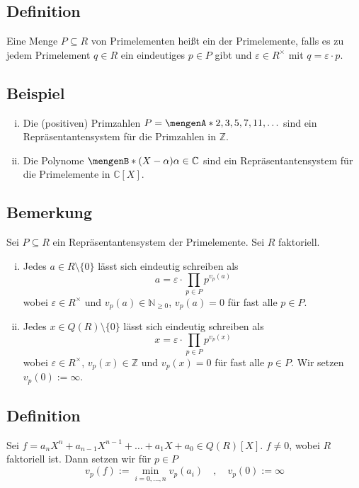 \subsection[Definition: Repräsentantensystem]{Definition} %
\label{sub:88}
Eine Menge $P \subseteq R$ von Primelementen heißt
ein  der Primelemente, falls es zu jedem Primelement $q \in R$ ein eindeutiges $p \in P$ gibt
und $\varepsilon \in R^\times$ mit $q= \varepsilon \cdot p$. 

\subsection[Beispiel für Repräsentantensysteme]{Beispiel} %
\label{sub:89}
\begin{enumerate}[i)]
	\item Die (positiven) Primzahlen $P=\set{2,3,5,7,11, \ldots} $ sind ein Repräsentantensystem für die Primzahlen in $\mathds{Z}$.
	\item Die Polynome $\set[(X- \alpha)]{\alpha \in \mathds{C}} $ sind ein Repräsentantensystem für die Primelemente in $\mathds{C}[X]$.
\end{enumerate}

\subsection[Bemerkung: Darstellung beliebiger Ringelemente durch Repräsentantensystem]{Bemerkung} %
\label{sub:810}
Sei $P \subseteq R$ ein Repräsentantensystem der Primelemente. Sei $R$ faktoriell.
\begin{enumerate}[i)]
	\item Jedes $a \in R \setminus \{0\}$ lässt sich eindeutig schreiben als
	\[
		a = \varepsilon \cdot \prod_{p \in P} p^{v_p(a)}
	\]
	wobei $\varepsilon \in R^\times$ und $v_p(a) \in \mathds{N}_{\ge 0}$, $v_p(a)=0$ für fast alle $p \in P$.
	\item Jedes $x \in Q(R) \setminus \{0\}$ lässt sich eindeutig schreiben als
	\[
		x = \varepsilon \cdot \prod_{p \in P} p^{v_p(x)}
	\]
	wobei $\varepsilon \in R^\times$, $v_p(x) \in \mathds{Z}$ und $v_p(x)=0$ für fast alle $p \in P$. Wir setzen $v_p(0) := \infty$.
\end{enumerate}

\subsection[Definition: Ordnung eines Polynoms bezüglich $p$]{Definition} %
\label{sub:811}
Sei $f = a_n X^n + a_{n-1} X^{n-1} + \ldots + a_1 X + a_0 \in Q(R)[X]$. $f \not= 0$, wobei $R$ faktoriell ist. Dann setzen wir für $p \in P$
\[
	v_p(f) := \min_{i=0,\ldots ,n} v_p(a_i) \quad , \quad v_p(0) := \infty
\]

